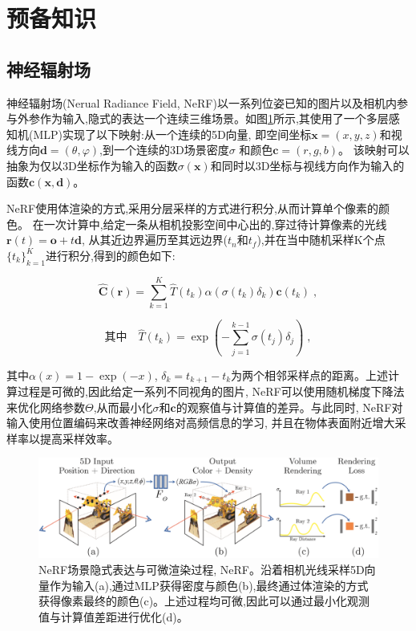 \section{预备知识}\label{preliminaries}

\subsection{神经辐射场}

神经辐射场(Nerual Radiance Field, NeRF)以一系列位姿已知的图片以及相机内参与外参作为输入,隐式的表达一个连续三维场景。如图\ref{nerf}所示,其使用了一个多层感知机(MLP)实现了以下映射:从一个连续的5D向量,
即空间坐标$\mathbf{x}=(x,y,z)$和视线方向$\mathbf{d}=( \theta,\varphi )$,到一个连续的3D场景密度$\sigma$ 和颜色$\mathbf{c}=(r,g,b)$。
该映射可以抽象为仅以3D坐标作为输入的函数$\sigma (\mathbf{x})$和同时以3D坐标与视线方向作为输入的函数$\mathbf{c(x,d)}$。

NeRF使用体渲染的方式,采用分层采样的方式进行积分,从而计算单个像素的颜色。
在一次计算中,给定一条从相机投影空间中心出的,穿过待计算像素的光线$\mathbf{r}(t)=\mathbf{o}+t\mathbf{d}$,
从其近边界遍历至其远边界($t_n$和$t_f$),并在当中随机采样K个点$\{t_k\}_{k=1}^K$进行积分,得到的颜色如下:

\begin{equation}
    \hat{\mathbf{C}}(\mathbf{r})=\sum_{k=1}^{K}\hat{T}(t_k)\alpha(\sigma(t_k)\delta_k)\mathbf{c}(t_k)\;,
\end{equation}

\begin{equation}
     \mbox{其中} \quad \hat{T}(t_k)=\exp{\left (-\sum_{j = 1}^{k-1}\sigma(t_j)\delta_j\right )}\;,
\end{equation}

其中$\alpha(x)=1-\exp{(-x)}$, $\delta_k=t_{k+1}-t_k$为两个相邻采样点的距离。上述计算过程是可微的,因此给定一系列不同视角的图片, NeRF可以使用随机梯度下降法来优化网络参数$\Theta$,从而最小化$\sigma$和$\mathbf{c}$的观察值与计算值的差异。与此同时, NeRF对输入使用位置编码来改善神经网络对高频信息的学习, 并且在物体表面附近增大采样率以提高采样效率。

\begin{figure}[htbp]
    \includegraphics[scale = 1.2]{figures/nerf.png}
    \centering
    \caption{NeRF场景隐式表达与可微渲染过程, NeRF\cite{nerf}。沿着相机光线采样5D向量作为输入(a),通过MLP获得密度与颜色(b),最终通过体渲染的方式获得像素最终的颜色(c)。上述过程均可微,因此可以通过最小化观测值与计算值差距进行优化(d)。} \label{nerf}
\end{figure}
